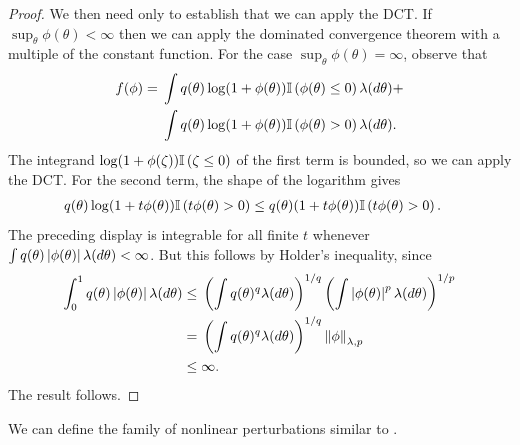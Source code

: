 \begin{lem}
\begin{proof}
We then need only to establish that we can apply the DCT. If $\sup_\theta
\phi(\theta) < \infty$ then we can apply the dominated convergence theorem with
a multiple of the constant function.  For the case $\sup_\theta \phi(\theta) =
\infty$, observe that
%
\begin{align*}
%
f(\phi) ={}&
    \int \q(\theta) \log(1 + \phi(\theta)) \ind{\phi(\theta) \le 0}
        \lambda(d\theta) + \\
    &\int \q(\theta) \log(1 + \phi(\theta)) \ind{\phi(\theta) > 0}
        \lambda(d\theta).
%
\end{align*}
%
The integrand $\log(1 + \phi(\zeta)) \mathbb{I}\left(\zeta \le 0\right)$ of the first term
is bounded, so we can apply the DCT.  For the second term, the shape of
the logarithm gives
%
\begin{align*}
%
\q(\theta) \log(1 + t \phi(\theta)) \ind{t \phi(\theta) > 0}   \le{}&
    \q(\theta) (1 + t \phi(\theta)) \ind{t \phi(\theta) > 0}.%
\end{align*}
%
The preceding display is integrable for all finite $t$ whenever $\int q(\theta)
\left|\phi(\theta)\right| \lambda(d\theta) < \infty$. But this follows by Holder's
inequality, since
%
\begin{align*}
%
\int_0^1 \q(\theta) \abs{\phi(\theta)} \lambda(d \theta) \le{}&
    \left( \int \q(\theta)^q \lambda(d \theta) \right)^{1/q}
    \left( \int \abs{\phi(\theta)}^p \lambda(d \theta) \right)^{1/p}
\\={}&
    \left( \int \q(\theta)^q \lambda(d \theta) \right)^{1/q}
    \norm{\phi}_{\lambda,p}
\\\le{}&
    \infty.
%
\end{align*}
%
The result follows.
%
\end{proof}
%
\end{lem}


We can define the family of nonlinear perturbations similar to
\citep{gustafson:1996:local}.

